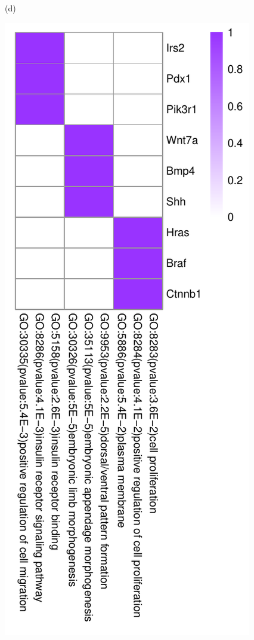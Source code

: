 \documentclass{bmcart}
\begin{document}
\begin{figure}[!h]
\begin{minipage}{.3\linewidth}
    \centerline{(d)}
  \end{minipage}
  \hfil
  \begin{minipage}{.3\linewidth}
   \includegraphics[width=\linewidth]{DrawPictures/v24.pdf}

\end{minipage}
\end{figure}
\end{document}
